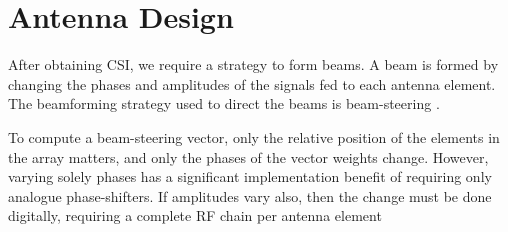 \section{Antenna Design}
\label{sec:antennas}








After obtaining CSI, we require a strategy to form beams. A beam is formed by changing the phases and amplitudes of the signals fed to each antenna element. The beamforming strategy used to direct the beams is beam-steering  . 

To compute a beam-steering vector, only the relative position of the elements in the array matters, and only the phases of the vector weights change. However, varying solely phases has a significant implementation benefit of requiring only analogue phase-shifters. If amplitudes vary also, then the change must be done digitally, requiring a complete RF chain per antenna element \cite{8744505}

\begin{comment} %
To only way of changing the amplitudes of the weights without requiring one RF chain per antenna element is to use windows (or tapers), which can reduce the \ac{SLL} at a cost of increasing the main beam width or at a cost of increasing the lobe-level past the secondary lobe. Such tapers attenuate by a constant and fixed amount the power transmitted by certain antenna elements. However, this matter will be left out of this thesis for conciseness, perhaps to be study in the future (Section \ref{sec:future-work}). Consequently, we form beams changing only phases across the beam-steering vector. Realistic antenna arrays with tenths, hundreds or even thousands of elements may use analogue phase-shifters to beamform at RF frequencies instead of doing it digitally at BB, for cost reasons.
\end{comment}

